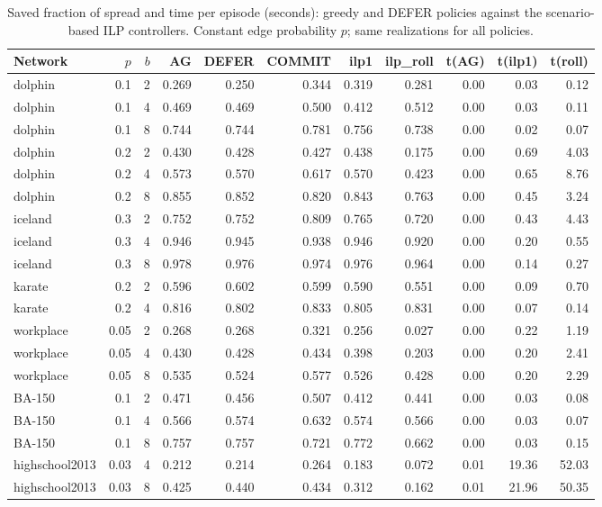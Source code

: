 \documentclass[ASNA,number]{USG}
\begin{document}
\begin{table}[h]
\centering
\caption{Saved fraction of spread and time per episode (seconds): greedy and DEFER
policies against the scenario-based ILP controllers. Constant edge probability
$p$; same realizations for all policies.\label{tab:ilp}}
\footnotesize
\begin{tabular}{lrrrrrrrrrr}
\hline
Network & $p$ & $b$ & AG & DEFER & COMMIT & ilp1 & ilp\_roll & t(AG) & t(ilp1) & t(roll)\\
\hline
dolphin & 0.1 & 2 & 0.269 & 0.250 & 0.344 & 0.319 & 0.281 & 0.00 & 0.03 & 0.12 \\
dolphin & 0.1 & 4 & 0.469 & 0.469 & 0.500 & 0.412 & 0.512 & 0.00 & 0.03 & 0.11 \\
dolphin & 0.1 & 8 & 0.744 & 0.744 & 0.781 & 0.756 & 0.738 & 0.00 & 0.02 & 0.07 \\
dolphin & 0.2 & 2 & 0.430 & 0.428 & 0.427 & 0.438 & 0.175 & 0.00 & 0.69 & 4.03 \\
dolphin & 0.2 & 4 & 0.573 & 0.570 & 0.617 & 0.570 & 0.423 & 0.00 & 0.65 & 8.76 \\
dolphin & 0.2 & 8 & 0.855 & 0.852 & 0.820 & 0.843 & 0.763 & 0.00 & 0.45 & 3.24 \\
iceland & 0.3 & 2 & 0.752 & 0.752 & 0.809 & 0.765 & 0.720 & 0.00 & 0.43 & 4.43 \\
iceland & 0.3 & 4 & 0.946 & 0.945 & 0.938 & 0.946 & 0.920 & 0.00 & 0.20 & 0.55 \\
iceland & 0.3 & 8 & 0.978 & 0.976 & 0.974 & 0.976 & 0.964 & 0.00 & 0.14 & 0.27 \\
karate & 0.2 & 2 & 0.596 & 0.602 & 0.599 & 0.590 & 0.551 & 0.00 & 0.09 & 0.70 \\
karate & 0.2 & 4 & 0.816 & 0.802 & 0.833 & 0.805 & 0.831 & 0.00 & 0.07 & 0.14 \\
workplace & 0.05 & 2 & 0.268 & 0.268 & 0.321 & 0.256 & 0.027 & 0.00 & 0.22 & 1.19 \\
workplace & 0.05 & 4 & 0.430 & 0.428 & 0.434 & 0.398 & 0.203 & 0.00 & 0.20 & 2.41 \\
workplace & 0.05 & 8 & 0.535 & 0.524 & 0.577 & 0.526 & 0.428 & 0.00 & 0.20 & 2.29 \\
BA-150 & 0.1 & 2 & 0.471 & 0.456 & 0.507 & 0.412 & 0.441 & 0.00 & 0.03 & 0.08 \\
BA-150 & 0.1 & 4 & 0.566 & 0.574 & 0.632 & 0.574 & 0.566 & 0.00 & 0.03 & 0.07 \\
BA-150 & 0.1 & 8 & 0.757 & 0.757 & 0.721 & 0.772 & 0.662 & 0.00 & 0.03 & 0.15 \\
highschool2013 & 0.03 & 4 & 0.212 & 0.214 & 0.264 & 0.183 & 0.072 & 0.01 & 19.36 & 52.03 \\
highschool2013 & 0.03 & 8 & 0.425 & 0.440 & 0.434 & 0.312 & 0.162 & 0.01 & 21.96 & 50.35 \\
\hline
\end{tabular}
\end{table}
\end{document}
